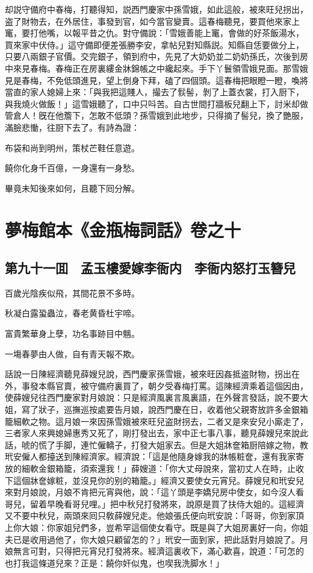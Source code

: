 却説守備府中春梅，打聽得知，説西門慶家中孫雪娥，如此這般，被來旺兒拐出，盗了財物去，在外居住，事發到官，如今當官變賣。這春梅聽見，要買他來家上竃，要打他嘴，以報平昔之仇。對守備說：「雪娥善能上竃，會做的好茶飯湯水，買來家中伏侍。」這守備即便差張勝李安，拿帖兒對知縣説。知縣自恁要做分上，只要八兩銀子官價。交完銀子，領到府中，先見了大奶奶並二奶奶孫氏，次後到房中來見春梅。春梅正在房裏縷金牀錦帳之中纔起來。手下丫鬟領雪娥見面。那雪娥見是春梅，不免低頭進見，望上倒身下拜，磕了四個頭。這春梅把眼瞪一瞪，喚將當直的家人媳婦上來：「與我把這賤人，撮去了䯼髻，剝了上蓋衣裳，打入厨下，與我燒火做飯！」這雪娥聽了，口中只呌苦。自古世間打牆板兒翻上下，討米却做管倉人！旣在他簷下，怎敢不低頭？孫雪娥到此地步，只得摘了髻兒，換了艷服，滿臉悲慟，往厨下去了。有詩為證：

布袋和尚到明州，策杖芒鞋任意遊。

饒你化身千百億，一身還有一身愁。

畢竟未知後來如何，且聽下囘分解。

\part*{夢梅館本《金瓶梅詞話》卷之十}

\chapter*{第九十一囬　孟玉樓愛嫁李衙内　李衙内怒打玉簪兒}

百歲光陰疾似飛，其間花景不多時。

秋凝白露蛩蟲泣，春老黄昏杜宇啼。

富貴繁華身上孽，功名事跡目中魑。

一塲春夢由人做，自有青天報不欺。

話說一日陳經濟聽見薛嫂兒說，西門慶家孫雪娥，被來旺因姦抵盗財物，拐出在外，事發本縣官賣，被守備府裏買了，朝夕受春梅打罵。這陳經濟乘着這個因由，使薛嫂兒往西門慶家對月娘說：只是經濟風裏言風裏語，在外聲言發話，說不要大姐，寫了狀子，巡撫巡按處要告月娘，說西門慶在日，收着他父親寄放許多金銀箱籠細軟之物。這月娘一來因孫雪娥被來旺兒盗財拐去，二者又是來安兒小廝走了，三者家人來興媳婦惠秀又死了，剛打發出去，家中正七事八事，聽見薛嫂兒來說此話，唬的慌了手脚，連忙僱轎子，打發大姐家去。但是大姐牀奩箱厨陪嫁之物，教玳安僱人都擡送到陳經濟家。經濟說：「這是他隨身嫁我的牀帳粧奩，還有我家寄放的細軟金銀箱籠，須索還我！」薛嫂道：「你大丈母說來，當初丈人在時，止收下這個牀奩嫁粧，並沒見你的别的箱籠。」經濟又要使女元宵兒。薛嫂兒和玳安兒來對月娘說，月娘不肯把元宵與他，說：「這丫頭是李嬌兒房中使女，如今沒人看哥兒，留着早晚看哥兒哩。」把中秋兒打發將來，說原是買了扶侍大姐的。這經濟又不要中秋兒，兩頭來囘只敎薛嫂兒走。他娘張氏便向玳安說：「哥哥，你到家頂上你大娘：你家姐兒們多，豈希罕這個使女看守。既是與了大姐房裏好一向，你姐夫已是收用過他了，你大娘只顧留怎的？」玳安一面到家，把此話對月娘說了。月娘無言可對，只得把元宵兒打發將來。經濟這裏收下，滿心歡喜，說道：「可怎的也打我這條道兒來？正是：饒你奸似鬼，也喫我洗脚水！」

